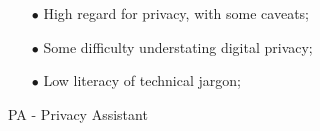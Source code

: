 \documentclass[xcolor={svgnames},compress,aspectratio=169]{beamer}
\begin{document}
\begin{frame}
\begin{multicols}{2}
        \columnbreak
        \begin{itemize}
            \item[$\bullet$]
            High regard for privacy, with some caveats;
            \item[$\bullet$]
            Some difficulty understating digital privacy;
            \item[$\bullet$]
            Low literacy of technical jargon;
        \end{itemize}
        \vspace{2cm}
        \begin{flushright}
            {\tiny *PA - Privacy Assistant}
        \end{flushright}
    \end{multicols}
\end{frame}

\end{document}
